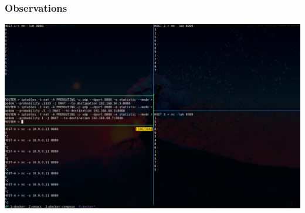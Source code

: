 \documentclass[11pt]{article}
\begin{document}
\subsubsection*{Observations}
\label{sec:orgfd3df05}
\begin{center}
\includegraphics[width=.9\linewidth]{./images/11.jpg}
\end{center}
\end{document}
